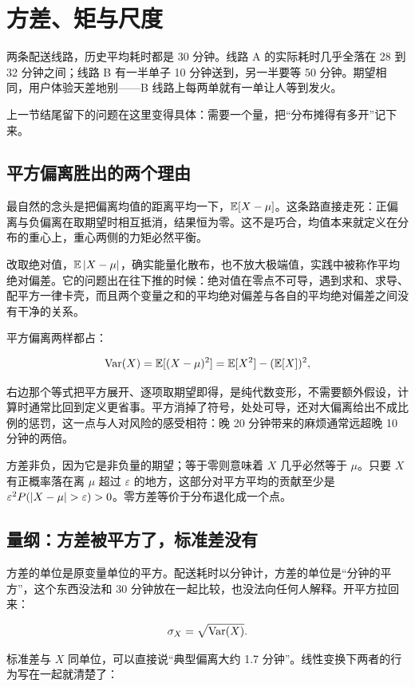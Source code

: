 \section{方差、矩与尺度}
\label{sec:05-Probability/04-Expectation-and-Moments/02}

两条配送线路，历史平均耗时都是 30 分钟。线路 A 的实际耗时几乎全落在 28 到 32 分钟之间；线路 B 有一半单子 10 分钟送到，另一半要等 50 分钟。期望相同，用户体验天差地别——B 线路上每两单就有一单让人等到发火。

上一节结尾留下的问题在这里变得具体：需要一个量，把``分布摊得有多开''记下来。

\subsection{平方偏离胜出的两个理由}

最自然的念头是把偏离均值的距离平均一下，\(\mathbb{E}[X-\mu]\)。这条路直接走死：正偏离与负偏离在取期望时相互抵消，结果恒为零。这不是巧合，均值本来就定义在分布的重心上，重心两侧的力矩必然平衡。

改取绝对值，\(\mathbb{E}\left|X-\mu\right|\)，确实能量化散布，也不放大极端值，实践中被称作平均绝对偏差。它的问题出在往下推的时候：绝对值在零点不可导，遇到求和、求导、配平方一律卡壳，而且两个变量之和的平均绝对偏差与各自的平均绝对偏差之间没有干净的关系。

平方偏离两样都占：

\[
\operatorname{Var}(X)=\mathbb{E}[(X-\mu)^2]=\mathbb{E}[X^2]-(\mathbb{E}[X])^2,
\]

右边那个等式把平方展开、逐项取期望即得，是纯代数变形，不需要额外假设，计算时通常比回到定义更省事。平方消掉了符号，处处可导，还对大偏离给出不成比例的惩罚，这一点与人对风险的感受相符：晚 20 分钟带来的麻烦通常远超晚 10 分钟的两倍。

方差非负，因为它是非负量的期望；等于零则意味着 \(X\) 几乎必然等于 \(\mu\)。只要 \(X\) 有正概率落在离 \(\mu\) 超过 \(\varepsilon\) 的地方，这部分对平方平均的贡献至少是 \(\varepsilon^2P(\abs{X-\mu}>\varepsilon)>0\)。零方差等价于分布退化成一个点。

\subsection{量纲：方差被平方了，标准差没有}

方差的单位是原变量单位的平方。配送耗时以分钟计，方差的单位是``分钟的平方''，这个东西没法和 30 分钟放在一起比较，也没法向任何人解释。开平方拉回来：

\[
\sigma_X=\sqrt{\operatorname{Var}(X)}.
\]

标准差与 \(X\) 同单位，可以直接说``典型偏离大约 1.7 分钟''。线性变换下两者的行为写在一起就清楚了：

